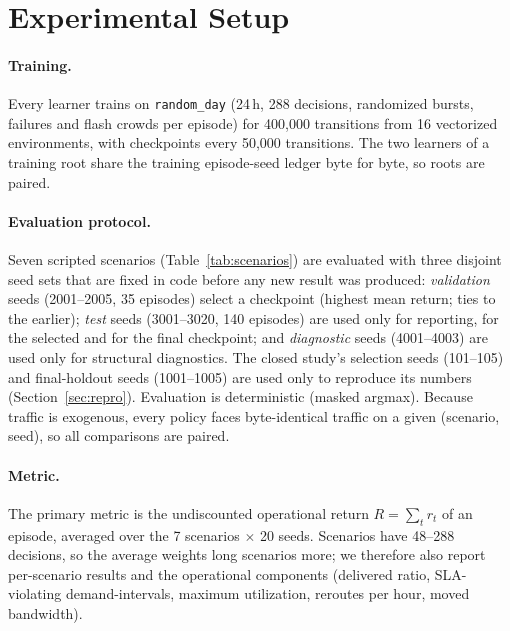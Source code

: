 \section{Experimental Setup}
\label{sec:setup}

\paragraph{Training.} Every learner trains on \texttt{random\_day} (24\,h, 288
decisions, randomized bursts, failures and flash crowds per episode) for
400{,}000 transitions from 16 vectorized environments, with checkpoints every
50{,}000 transitions. The two learners of a training root share the training
episode-seed ledger byte for byte, so roots are paired.

\paragraph{Evaluation protocol.} Seven scripted scenarios
(Table~\ref{tab:scenarios}) are evaluated with three disjoint seed sets that are
fixed in code before any new result was produced: \emph{validation} seeds
(2001--2005, 35 episodes) select a checkpoint (highest mean return; ties to the
earlier); \emph{test} seeds (3001--3020, 140 episodes) are used only for
reporting, for the selected and for the final checkpoint; and
\emph{diagnostic} seeds (4001--4003) are used only for structural diagnostics.
The closed study's selection seeds (101--105) and final-holdout seeds
(1001--1005) are used only to reproduce its numbers
(Section~\ref{sec:repro}). Evaluation is deterministic (masked argmax). Because
traffic is exogenous, every policy faces byte-identical traffic on a given
(scenario, seed), so all comparisons are paired.

\paragraph{Metric.} The primary metric is the undiscounted operational return
$R=\sum_t r_t$ of an episode, averaged over the 7 scenarios $\times$ 20 seeds.
Scenarios have 48--288 decisions, so the average weights long scenarios more;
we therefore also report per-scenario results and the operational components
(delivered ratio, SLA-violating demand-intervals, maximum utilization,
reroutes per hour, moved bandwidth).

